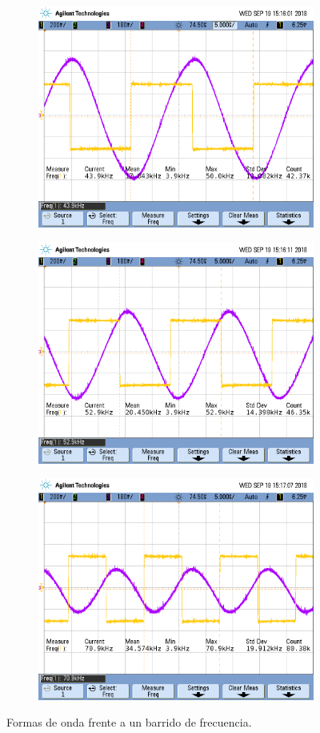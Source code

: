\begin{figure}[H]
\centering
\begin{subfigure}
  \centering
  \includegraphics[width=.8\textwidth]{Ejercicio2/Mediciones/A/waveform7.png}  
\end{subfigure}
\begin{subfigure}
  \centering
  \includegraphics[width=.8\textwidth]{Ejercicio2/Mediciones/A/waveform8.png}  
\end{subfigure}
\begin{subfigure}
  \centering
  \includegraphics[width=.8\textwidth]{Ejercicio2/Mediciones/A/waveform9.png}  
\end{subfigure}
\caption{Formas de onda frente a un barrido de frecuencia.}
\label{fig:fig}
\end{figure}


